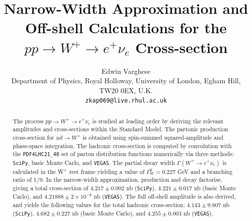 \documentclass[a4paper,11pt]{article}
\title{\textbf{Narrow-Width Approximation and Off-shell Calculations for the $pp \rightarrow W^+ \rightarrow e^+ \nu_e$ Cross-section}}
\author{
	Edwin Varghese\\[10pt]
	\small Department of Physics, Royal Holloway, University of London, Egham Hill, TW20 0EX, U.K.\\
	\texttt{\small zkap069@live.rhul.ac.uk}
}
\date{}
\begin{document}
	
	\maketitle
	
	\begin{abstract}
	The process $pp \rightarrow W^+ \rightarrow e^+ \nu_e$ is studied at leading order by deriving the relevant amplitudes and cross-sections within the Standard Model. The partonic production cross-section for $u\bar{d} \rightarrow W^+$ is obtained using spin-summed squared-amplitude and phase-space integration. The hadronic cross-section is computed by convolution with the \texttt{PDF4LHC21\_40} set of parton distribution functions numerically via three methods: \texttt{SciPy}, basic Monte Carlo, and \texttt{VEGAS}. The partial decay width $\Gamma(W^+ \rightarrow e^+ \nu_e)$ is calculated in the W$^+$ rest frame yielding a value of $\Gamma^0_W = 0.227$ GeV and a branching ratio of 1/9. In the narrow-width approximation, production and decay factorise, giving a total cross-section of $4.217 \pm 0.002$ nb (\texttt{SciPy}), $4.221 \pm 0.017$ nb (basic Monte Carlo), and $4.21888 \pm 2\times10^{-6}$ nb (\texttt{VEGAS}). The full off-shell amplitude is also derived, and yields the following values for the total hadronic cross-section: $4.143 \pm 9.807$ nb (\texttt{SciPy}), $4.682 \pm 0.227$ nb (basic Monte Carlo), and $4.255 \pm 0.003$ nb (\texttt{VEGAS}).
		
		
	\end{abstract}
	
	
	\newpage
	\tableofcontents
\end{document}
